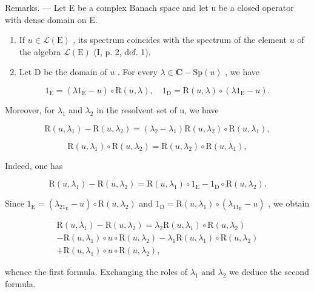 Remarks. --- Let E be a complex Banach space and let u be a closed operator with dense domain on E.

\begin{enumerate}
\def\labelenumi{\arabic{enumi})}
\item
  If \(u \in \mathcal{L}(\mathrm{E})\) , its spectrum coincides with the spectrum of the element \(u\) of the algebra \(\mathcal{L}(\mathrm{E})\) (I, p. 2, def. 1).
\item
  Let D be the domain of \(u\) . For every \(\lambda \in \mathbf{C} - \mathrm{Sp}(u)\) , we have
\end{enumerate}

\[
1 _ {\mathrm{E}} = (\lambda 1 _ {\mathrm{E}} - u) \circ \mathrm{R} (u, \lambda), \quad 1 _ {\mathrm{D}} = \mathrm{R} (u, \lambda) \circ (\lambda 1 _ {\mathrm{E}} - u).\tag{7}
\]

Moreover, for \(\lambda_{1}\) and \(\lambda_{2}\) in the resolvent set of u, we have

\[
\mathrm{R} (u, \lambda_ {1}) - \mathrm{R} (u, \lambda_ {2}) = (\lambda_ {2} - \lambda_ {1}) \mathrm{R} (u, \lambda_ {2}) \circ \mathrm{R} (u, \lambda_ {1}),\tag{8}
\]

\[
\mathrm{R} (u, \lambda_ {1}) \circ \mathrm{R} (u, \lambda_ {2}) = \mathrm{R} (u, \lambda_ {2}) \circ \mathrm{R} (u, \lambda_ {1}),\tag{9}
\]

Indeed, one has

\[
\mathrm{R} (u, \lambda_ {1}) - \mathrm{R} (u, \lambda_ {2}) = \mathrm{R} (u, \lambda_ {1}) \circ 1 _ {\mathrm{E}} - 1 _ {\mathrm{D}} \circ \mathrm{R} (u, \lambda_ {2}).
\]

Since \(1_{\mathrm{E}} = (\lambda_21_{\mathrm{E}} - u)\circ \mathrm{R}(u,\lambda_2)\) and \(1_{\mathrm{D}} = \mathrm{R}(u,\lambda_1)\circ (\lambda_11_{\mathrm{E}} - u)\) , we obtain

\[
\begin{array}{c} \mathrm{R} (u, \lambda_ {1}) - \mathrm{R} (u, \lambda_ {2}) = \lambda_ {2} \mathrm{R} (u, \lambda_ {1}) \circ \mathrm{R} (u, \lambda_ {2}) \\ - \mathrm{R} (u, \lambda_ {1}) \circ u \circ \mathrm{R} (u, \lambda_ {2}) - \lambda_ {1} \mathrm{R} (u, \lambda_ {1}) \circ \mathrm{R} (u, \lambda_ {2}) \\ + \mathrm{R} (u, \lambda_ {1}) \circ u \circ \mathrm{R} (u, \lambda_ {2}), \end{array}
\]

whence the first formula. Exchanging the roles of \(\lambda_{1}\) and \(\lambda_{2}\) we deduce the second formula.

